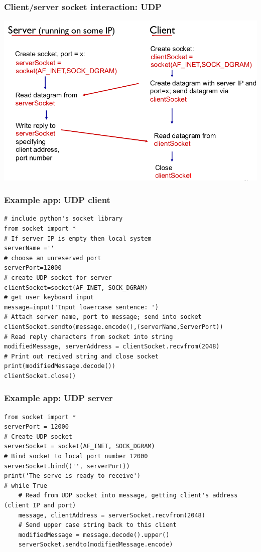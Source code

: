 \documentclass{article}[18pt]
\begin{document}
\subsubsection{Client/server socket interaction: UDP}
\begin{center}
	\includegraphics[scale=0.7]{UDP}
\end{center}
\subsubsection{Example app: UDP client}
\begin{verbatim}
# include python's socket library
from socket import *
# If server IP is empty then local system
serverName =''
# choose an unreserved port
serverPort=12000
# create UDP socket for server
clientSocket=socket(AF_INET, SOCK_DGRAM)
# get user keyboard input
message=input('Input lowercase sentence: ')
# Attach server name, port to message; send into socket
clientSocket.sendto(message.encode(),(serverName,ServerPort))
# Read reply characters from socket into string
modifiedMessage, serverAddress = clientSocket.recvfrom(2048)
# Print out recived string and close socket
print(modifiedMessage.decode())
clientSocket.close()
\end{verbatim}
\subsubsection{Example app: UDP server}
\begin{verbatim}
from socket import *
serverPort = 12000
# Create UDP socket
serverSocket = socket(AF_INET, SOCK_DGRAM)
# Bind socket to local port number 12000
serverSocket.bind(('', serverPort))
print('The serve is ready to receive')
# while True
	# Read from UDP socket into message, getting client's address (client IP and port)
	message, clientAddress = serverSocket.recvfrom(2048)
	# Send upper case string back to this client
	modifiedMessage = message.decode().upper()
	serverSocket.sendto(modifiedMessage.encode)
\end{verbatim}
\end{document}
